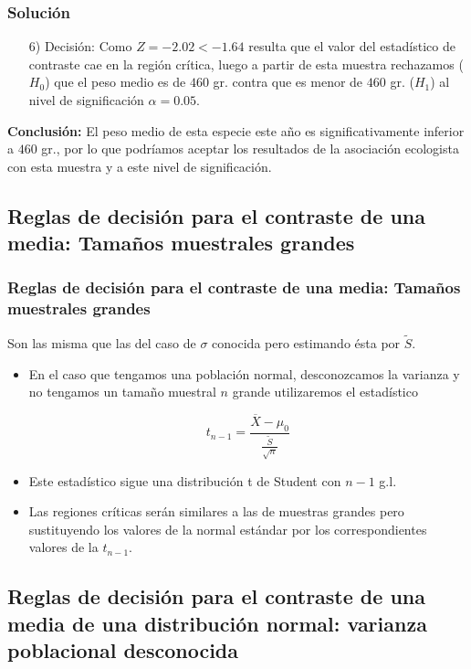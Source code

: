 \begin{frame}
\frametitle{Solución}
\begin{itemize}
\item[6)] Decisión: Como $Z=-2.02<-1.64$ resulta que el valor del estadístico
 de contraste cae  en la región crítica, luego  a partir de esta
 muestra rechazamos
  ($H_{0}$) que el peso medio es de $460$ gr.  contra que es
 menor de $460$ gr. ($H_{1}$) al nivel de significación $\alpha=0.05$.

\end{itemize} 

\textbf{Conclusión:}  El peso medio  de esta especie este año es significativamente inferior a $460$ gr., por lo que
 podríamos aceptar los resultados de la asociación  ecologista con esta muestra  y a este nivel de significación.
\end{frame}

\subsection{Reglas de decisión para el contraste de una media: Tamaños muestrales grandes}
\begin{frame}

\frametitle{Reglas de decisión para el contraste de una media: Tamaños muestrales grandes}

Son las misma que las del caso de $\sigma$ conocida pero estimando ésta por $\tilde{S}$.

\begin{itemize}
\item  En el caso que tengamos una población normal, desconozcamos la varianza y no tengamos un tamaño  muestral $n$ grande utilizaremos el estadístico

    $$t_{n-1}= \frac{\overline{X}-\mu_{0}}{\frac{\tilde{S}}{\sqrt{n}}}$$

\item Este estadístico sigue una distribución t de Student con $n-1$ g.l.
\item Las regiones críticas serán similares a las de muestras grandes pero sustituyendo los
valores de la normal estándar por los correspondientes valores de la $t_{n-1}$.
\end{itemize}
\end{frame}


\subsection{Reglas de decisión para el contraste de una media de una distribución normal: varianza poblacional  desconocida}

